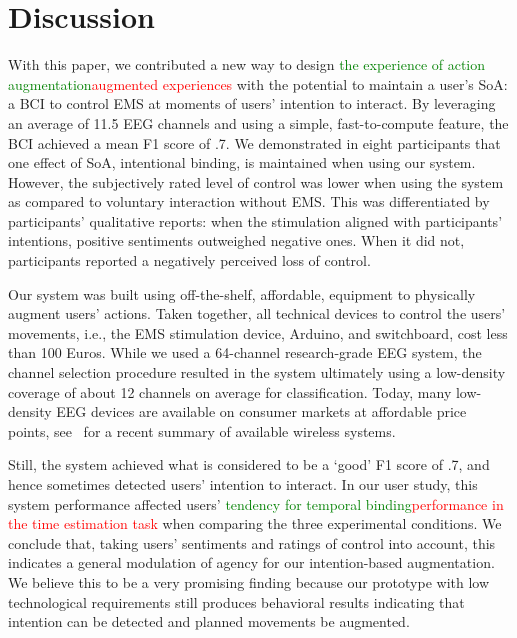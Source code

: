 \section{Discussion}
With this paper, we contributed a new way to design \textcolor{green}{the experience of action augmentation}\textcolor{red}{augmented experiences} with the potential to maintain a user's SoA: a BCI to control EMS at moments of users' intention to interact. By leveraging an average of 11.5 EEG channels and using a simple, fast-to-compute feature, the BCI achieved a mean F1 score of .7. We demonstrated in eight participants that one effect of SoA, intentional binding, is maintained when using our system. However, the subjectively rated level of control was lower when using the system as compared to voluntary interaction without EMS. This was differentiated by participants' qualitative reports: when the stimulation aligned with participants' intentions, positive sentiments outweighed negative ones. When it did not, participants reported a negatively perceived loss of control.

Our system was built using off-the-shelf, affordable, equipment to physically augment users' actions. Taken together, all technical devices to control the users' movements, i.e., the EMS stimulation device, Arduino, and switchboard, cost less than 100 Euros. While we used a 64-channel research-grade EEG system, the channel selection procedure resulted in the system ultimately using a low-density coverage of about 12 channels on average for classification. Today, many low-density EEG devices are available on consumer markets at affordable price points, see~\citet{Niso2023-ce} for a recent summary of available wireless systems. 

Still, the system achieved what is considered to be a `good' F1 score of .7, and hence sometimes detected users' intention to interact. In our user study, this system performance affected users' \textcolor{green}{tendency for temporal binding}\textcolor{red}{performance in the time estimation task} when comparing the three experimental conditions. We conclude that, taking users' sentiments and ratings of control into account, this indicates a general modulation of agency for our intention-based augmentation. We believe this to be a very promising finding because our prototype with low technological requirements still produces behavioral results indicating that intention can be detected and planned movements be augmented.

